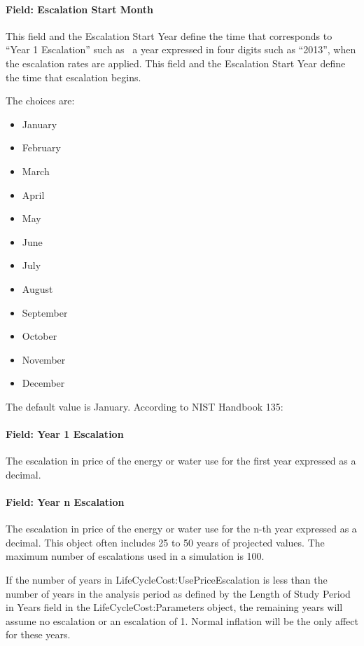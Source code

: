 \paragraph{Field: Escalation Start Month}\label{field-escalation-start-month}

This field and the Escalation Start Year define the time that corresponds to ``Year 1 Escalation'' such as~ a year expressed in four digits such as ``2013'', when the escalation rates are applied. This field and the Escalation Start Year define the time that escalation begins.

The choices are:

\begin{itemize}
\item
  January
\item
  February
\item
  March
\item
  April
\item
  May
\item
  June
\item
  July
\item
  August
\item
  September
\item
  October
\item
  November
\item
  December
\end{itemize}

The default value is January. According to NIST Handbook 135:

\paragraph{Field: Year 1 Escalation}\label{field-year-1-escalation}

The escalation in price of the energy or water use for the first year expressed as a decimal.

\paragraph{Field: Year n Escalation}\label{field-year-n-escalation}

The escalation in price of the energy or water use for the n-th year expressed as a decimal. This object often includes 25 to 50 years of projected values. The maximum number of escalations used in a simulation is 100.

If the number of years in LifeCycleCost:UsePriceEscalation is less than the number of years in the analysis period as defined by the Length of Study Period in Years field in the LifeCycleCost:Parameters object, the remaining years will assume no escalation or an escalation of 1. Normal inflation will be the only affect for these years.

